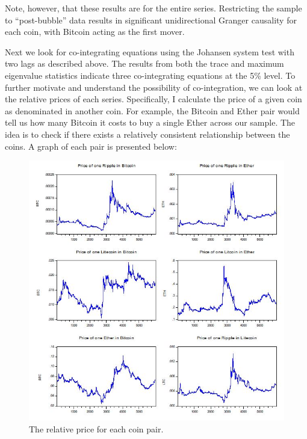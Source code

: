 \documentclass{article}
\begin{document}
	Note, however, that these results are for the entire series. Restricting the sample to ``post-bubble'' data results in significant unidirectional Granger causality for each coin, with Bitcoin acting as the first mover. 
	
	Next we look for co-integrating equations using the Johansen system test with two lags as described above. The results from both the trace and maximum eigenvalue statistics indicate three co-integrating equations at the 5\% level. To further motivate and understand the possibility of co-integration, we can look at the relative prices of each series. Specifically, I calculate the price of a given coin as denominated in another coin. For example, the Bitcoin and Ether pair would tell us how many Bitcoin it costs to buy a single Ether across our sample. The idea is to check if there exists a relatively consistent relationship between the coins. A graph of each pair is presented below:
	
	\begin{figure}[H]
	 	\centering
	 	\includegraphics[width = .75\textwidth]{RelativePrices_allCoins.jpg}
	 	\caption{The relative price for each coin pair.}
	\end{figure}
\end{document}
